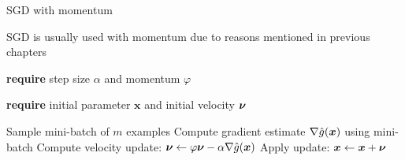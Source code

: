 \documentclass[11pt,compress,t,notes=noshow, xcolor=table]{beamer}
\begin{document}
\begin{framei}[fs=small]{SGD with momentum}
\item SGD is usually used with momentum due to reasons mentioned in previous chapters
\vfill
\begin{algorithm}[H]
\small
\caption{Stochastic gradient descent with momentum}
\begin{algorithmic}[1]
\State \textbf{require} step size $\alpha$ and momentum $\varphi$ \strut
\State \textbf{require} initial parameter $\bm{x}$ and initial velocity $\bm{\nu}$ \strut
{}
\State Sample mini-batch of $m$ examples
\State Compute gradient estimate $\nabla \hat{g}(\bm{x})$ using mini-batch
\State Compute velocity update: $\bm{\nu} \leftarrow \varphi \bm{\nu} - \alpha \nabla \hat{g}(\bm{x})$
\State Apply update: $\bm{x} \leftarrow \bm{x} + \bm{\nu}$
\EndWhile
\end{algorithmic}
\end{algorithm}
\end{framei}


\endlecture
\end{document}
